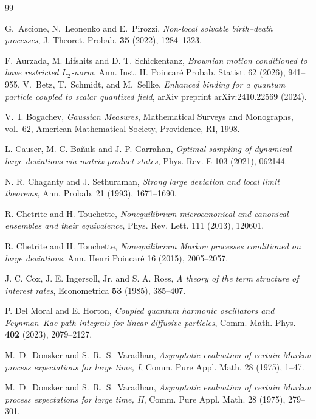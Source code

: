 \documentclass[11pt,reqno]{amsart}
\theoremstyle{definition}
\numberwithin{equation}{section}
\newcommand{\<}{\langle}
\renewcommand{\>}{\rangle}
\begin{document}
\begin{thebibliography}{99}

G.~Ascione, N.~Leonenko and E.~Pirozzi,
\emph{Non-local solvable birth--death processes},
J. Theoret. Probab. \textbf{35} (2022), 1284--1323.

F. Aurzada, M. Lifshits and D. T. Schickentanz,
\emph{Brownian motion conditioned to have restricted $L_2$-norm},
Ann. Inst. H. Poincar\'e Probab. Statist.
62 (2026), 941--955.
V.~Betz, T.~Schmidt, and M.~Sellke, 
\emph{Enhanced binding for a quantum particle coupled to scalar quantized field}, 
arXiv preprint arXiv:2410.22569 (2024).

V.~I. Bogachev, \emph{Gaussian Measures}, Mathematical Surveys and Monographs, vol.~62, American Mathematical Society, Providence, RI, 1998.

L. Causer, M. C. Ba{\~n}uls and J. P. Garrahan,
\emph{Optimal sampling of dynamical large deviations via matrix product
states},
Phys. Rev. E 103 (2021), 062144.


N. R. Chaganty and J. Sethuraman,
\emph{Strong large deviation and local limit theorems},
Ann. Probab. 21 (1993), 1671--1690.

R. Chetrite and H. Touchette,
\emph{Nonequilibrium microcanonical and canonical ensembles and their
equivalence},
Phys. Rev. Lett. 111 (2013), 120601.

R. Chetrite and H. Touchette,
\emph{Nonequilibrium Markov processes conditioned on large deviations},
Ann. Henri Poincar\'e 16 (2015), 2005--2057.

J. C. Cox, J. E. Ingersoll, Jr. and S. A. Ross,
\emph{A theory of the term structure of interest rates},
Econometrica \textbf{53} (1985), 385--407.


P. Del Moral and E. Horton,
\emph{Coupled quantum harmonic oscillators and Feynman--Kac path integrals
for linear diffusive particles},
Comm. Math. Phys. \textbf{402} (2023), 2079--2127.

M.~D.~Donsker and S.~R.~S.~Varadhan,
\emph{Asymptotic evaluation of certain Markov process expectations for
large time, I},
Comm. Pure Appl. Math. 28 (1975), 1--47.

M.~D.~Donsker and S.~R.~S.~Varadhan,
\emph{Asymptotic evaluation of certain Markov process expectations for
large time, II},
Comm. Pure Appl. Math. 28 (1975), 279--301.


\end{thebibliography}
\end{document}
